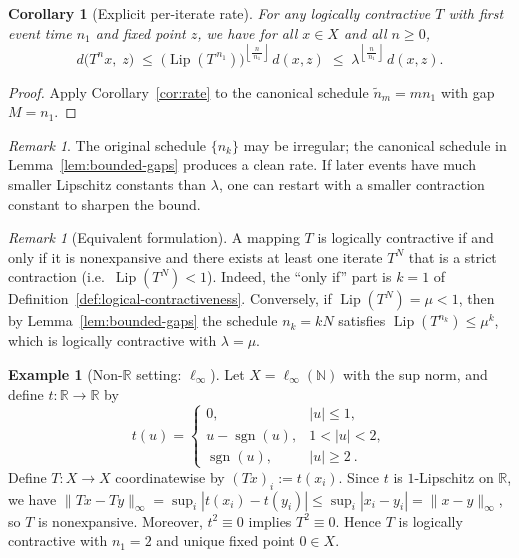\documentclass[11pt]{article}
\newtheorem{corollary}[theorem]{Corollary}
\theoremstyle{definition}
\newtheorem{example}[theorem]{Example}
\theoremstyle{remark}
\newtheorem{remark}[theorem]{Remark}
\DeclareMathOperator{\Lip}{Lip}
\DeclareMathOperator{\sgn}{sgn}
\begin{document}
\begin{corollary}[Explicit per-iterate rate]\label{cor:rate-nogap}
For any logically contractive $T$ with first event time $n_1$ and fixed point $z$, we have for all $x\in X$ and all $n\ge 0$,
\[
d\!\big(T^n x,\;z\big) \;\le\; \big(\Lip(T^{\,n_1})\big)^{\left\lfloor \frac{n}{\,n_1\,}\right\rfloor} \, d(x,z)
\;\le\; \lambda^{\left\lfloor \frac{n}{\,n_1\,}\right\rfloor} \, d(x,z).
\]
\end{corollary}

\begin{proof}
Apply Corollary~\ref{cor:rate} to the canonical schedule $\tilde n_m= m n_1$ with gap $M=n_1$.
\end{proof}

\begin{remark}
The original schedule $\{n_k\}$ may be irregular; the canonical schedule in Lemma~\ref{lem:bounded-gaps} produces a clean rate. If later events have much smaller Lipschitz constants than $\lambda$, one can restart with a smaller contraction constant to sharpen the bound.
\end{remark}

\begin{remark}[Equivalent formulation]\label{rem:equiv}
A mapping $T$ is logically contractive if and only if it is nonexpansive and there exists at least one iterate $T^N$ that is a strict contraction (i.e.\ $\Lip(T^N)<1$). Indeed, the ``only if'' part is $k=1$ of Definition~\ref{def:logical-contractiveness}. Conversely, if $\Lip(T^N)=\mu<1$, then by Lemma~\ref{lem:bounded-gaps} the schedule $n_k=kN$ satisfies $\Lip(T^{n_k})\le \mu^k$, which is logically contractive with $\lambda=\mu$.
\end{remark}

\begin{example}[Non-\texorpdfstring{$\mathbb{R}$}{R} setting: $\ell_\infty$]\label{ex:linfty}
Let $X=\ell_\infty(\mathbb{N})$ with the sup norm, and define $t:\mathbb{R}\to\mathbb{R}$ by
\[
t(u)=
\begin{cases}
0, & |u|\le 1,\\
u-\sgn(u), & 1<|u|<2,\\
\sgn(u), & |u|\ge 2~.
\end{cases}
\]
Define $T:X\to X$ coordinatewise by $(Tx)_i:=t(x_i)$. Since $t$ is $1$-Lipschitz on $\mathbb{R}$, we have
$\|Tx-Ty\|_\infty=\sup_i |t(x_i)-t(y_i)|\le \sup_i |x_i-y_i|=\|x-y\|_\infty$, so $T$ is nonexpansive. Moreover, $t^2\equiv 0$ implies $T^2\equiv 0$. Hence $T$ is logically contractive with $n_1=2$ and unique fixed point $0\in X$.
\end{example}
\end{document}
